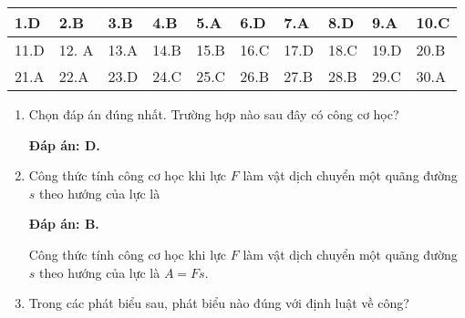 \let\lesson\undefined
\newcommand{\lesson}{\phantomlesson{Ôn tập chương 6}}
\setcounter{section}{2}
\ANSMCQ
{	\begin{center}
		\begin{tabular}{|m{2.8em}|m{2.8em}|m{2.8em}|m{2.8em}|m{2.8em}|m{2.8em}|m{2.8em}|m{2.8em}|m{2.8em}|m{2.8em}|}
		\hline
		1.D  & 2.B  & 3.B  & 4.B  & 5.A  & 6.D  & 7.A  & 8.D  & 9.A  & 10.C  \\
		\hline
		11.D  & 12. A  & 13.A  & 14.B  & 15.B  & 16.C  & 17.D  & 18.C  & 19.D  & 20.B  \\
		\hline
		21.A  & 22.A  & 23.D  & 24.C & 25.C  &26.B   & 27.B  &28.B   & 29.C  & 30.A \\
		\hline
		\end{tabular}
	\end{center}
}
\begin{enumerate}[label=\bfseries Câu \arabic*:, leftmargin=1.5cm]
	\item {}
	
	
	{
		Chọn đáp án đúng nhất. Trường hợp nào sau đây có công cơ học?
	}
	
	\hideall
	{	
		\textbf{Đáp án: D.}
	}
	\item {}
	
	
	{
		Công thức tính công cơ học khi lực $F$ làm vật dịch chuyển một quãng đường $s$ theo hướng của lực là
	}
	
	\hideall
	{	
		\textbf{Đáp án: B.}
		
		Công thức tính công cơ học khi lực $F$ làm vật dịch chuyển một quãng đường $s$ theo hướng của lực là $A=Fs$.
	}
	\item {}
	
	
	{
		Trong các phát biểu sau, phát biểu nào đúng với định luật về công?
	}
	

\end{enumerate}

